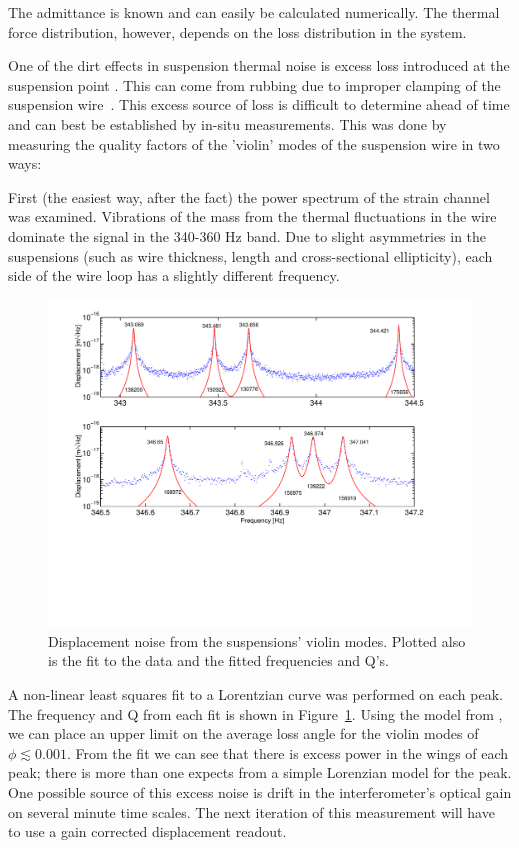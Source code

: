 The admittance is known and can easily be calculated numerically. The thermal
force distribution, however, depends on the loss distribution in the system.

One of the dirt effects in suspension thermal noise is excess loss introduced
at the suspension point \cite{Kovalik:Clamps}. This can 
come from rubbing due to improper clamping of the suspension 
wire~\cite{Kovalik:ClampSpeech}. This excess source of loss is difficult to
determine ahead of time and can best be established by in-situ measurements.
This was done by measuring the quality factors of the 'violin' modes of the
suspension wire in two ways:

First (the easiest way, after the fact) the power spectrum of the strain
channel was examined. Vibrations of the 
mass from the thermal fluctuations in the wire dominate the signal in the
340-360 Hz band. Due to slight asymmetries in the suspensions (such as wire
thickness, length and cross-sectional ellipticity), each side of
the wire loop has a slightly different frequency.

\begin{figure}[!h]
\centerline{
\includegraphics[angle=0,width=6.5in]{Figures/Chap4/violins.pdf}}
\caption[Violin Modes]{Displacement noise from the suspensions' violin
         modes. Plotted also is the fit to the data and the fitted
         frequencies and Q's.}
\label{fig:ViolinModes}
\end{figure}
A non-linear least squares fit to a Lorentzian curve was performed on each
peak. The frequency and Q from each fit is shown in Figure~\ref{fig:ViolinModes}.
Using the model from \cite{Gaby:Thermal}, we can place an upper limit on the average
loss angle for the violin modes of $\phi \lesssim 0.001$. From the fit we can see
that there is excess power in the wings of each peak; there is more than one
expects from a simple Lorenzian model for the peak. One possible source of this
excess noise is drift in the interferometer's optical gain on several minute
time scales. The next iteration of this measurement will have to use a gain corrected
displacement readout.


